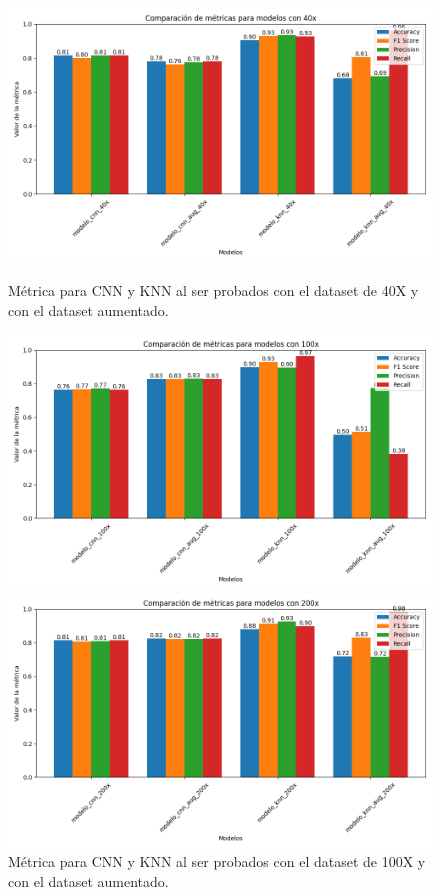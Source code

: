 \documentclass[12pt]{article} %
\begin{document}
\newpage
\begin{figure}[!ht]
    \centering
    \begin{minipage}[b]{0.45\textwidth}
        \centering
        \includegraphics[width=\textwidth]{comparison_40x.png}
        \caption{Métrica para CNN y KNN al ser probados con el dataset de 40X y con el dataset aumentado.}
        \label{fig:figura2}
    \end{minipage}
    \hfill
    \begin{minipage}[b]{0.45\textwidth}
        \centering
        \includegraphics[width=\textwidth]{comparison_100x.png}
        \caption{Métrica para CNN y KNN al ser probados con el dataset de 100X y con el dataset aumentado.}
        \label{fig:figura3}
    \end{minipage}
    \vspace{0.5cm}
    \begin{minipage}[b]{0.45\textwidth}
        \centering
        \includegraphics[width=\textwidth]{comparison_200x.png}

\end{minipage}
\end{figure}
\end{document}
